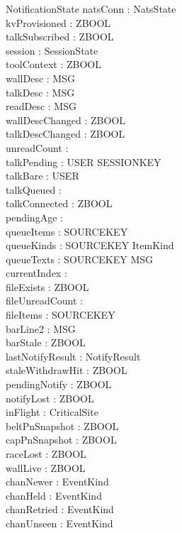 \documentclass[a4paper,10pt,fleqn]{article}
\begin{document}
\begin{schema}{NotificationState}
  natsConn : NatsState \\
  kvProvisioned : ZBOOL \\
  talkSubscribed : ZBOOL \\
  session : SessionState \\
  toolContext : ZBOOL \\
  wallDesc : MSG \\
  talkDesc : MSG \\
  readDesc : MSG \\
  wallDescChanged : ZBOOL \\
  talkDescChanged : ZBOOL \\
  unreadCount : \nat \\
  talkPending : USER \pfun SESSIONKEY \\
  talkBare : \power USER \\
  talkQueued : \nat \\
  talkConnected : ZBOOL \\
  pendingAge : \nat \\
  queueItems : \seq SOURCEKEY \\
  queueKinds : SOURCEKEY \pfun ItemKind \\
  queueTexts : SOURCEKEY \pfun MSG \\
  currentIndex : \nat \\
  fileExists : ZBOOL \\
  fileUnreadCount : \nat \\
  fileItems : \seq SOURCEKEY \\
  barLine2 : MSG \\
  barStale : ZBOOL \\
  lastNotifyResult : NotifyResult \\
  staleWithdrawHit : ZBOOL \\
  pendingNotify : ZBOOL \\
  notifyLost : ZBOOL \\
  inFlight : \power CriticalSite \\
  beltPnSnapshot : ZBOOL \\
  capPnSnapshot : ZBOOL \\
  raceLost : ZBOOL \\
  wallLive : ZBOOL \\
  chanNewer : \power EventKind \\
  chanHeld : \power EventKind \\
  chanRetried : \power EventKind \\
  chanUnseen : \power EventKind \\

\end{schema}
\end{document}
